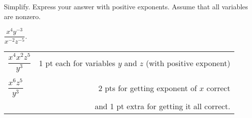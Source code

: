 
{
	Simplify. Express your answer with positive exponents. Assume that all variables are nonzero. 
	
	\bigskip \noindent $\dfrac{x^{4}y^{-3}}{x^{-2}z^{-5}}$.
}
{
	\begin{tabular}{l r}
	$\dfrac{x^4x^2z^5}{y^3}$ & 1 pt each for variables $y$ and $z$ (with positive exponent)\\ \\
	$\dfrac{x^6z^5}{y^3}$ & 2 pts for getting exponent of $x$ correct\\
	& and 1 pt extra for getting it all correct.
	\end{tabular}
}
